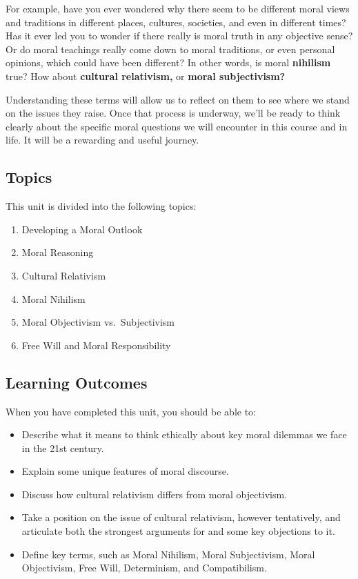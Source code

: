 \documentclass[
]{book}
\providecommand{\tightlist}{%
  \setlength{\itemsep}{0pt}\setlength{\parskip}{0pt}}
\begin{document}
For example, have you ever wondered why there seem to be different moral views and traditions in different places, cultures, societies, and even in different times? Has it ever led you to wonder if there really is moral truth in any objective sense? Or do moral teachings really come down to moral traditions, or even personal opinions, which could have been different? In other words, is moral \textbf{nihilism} true? How about \textbf{cultural relativism,} or \textbf{moral subjectivism?}

Understanding these terms will allow us to reflect on them to see where we stand on the issues they raise. Once that process is underway, we'll be ready to think clearly about the specific moral questions we will encounter in this course and in life. It will be a rewarding and useful journey.

\hypertarget{topics}{%
\subsection*{Topics}\label{topics}}

This unit is divided into the following topics:

\begin{enumerate}
\def\labelenumi{\arabic{enumi}.}
\tightlist
\item
  Developing a Moral Outlook
\item
  Moral Reasoning
\item
  Cultural Relativism
\item
  Moral Nihilism
\item
  Moral Objectivism vs.~Subjectivism
\item
  Free Will and Moral Responsibility
\end{enumerate}

\hypertarget{learning-outcomes}{%
\subsection*{Learning Outcomes}\label{learning-outcomes}}

When you have completed this unit, you should be able to:

\begin{itemize}
\tightlist
\item
  Describe what it means to think ethically about key moral dilemmas we face in the 21st century.
\item
  Explain some unique features of moral discourse.
\item
  Discuss how cultural relativism differs from moral objectivism.
\item
  Take a position on the issue of cultural relativism, however tentatively, and articulate both the strongest arguments for and some key objections to it.
\item
  Define key terms, such as Moral Nihilism, Moral Subjectivism, Moral Objectivism, Free Will, Determinism, and Compatibilism.
\end{itemize}
\end{document}
